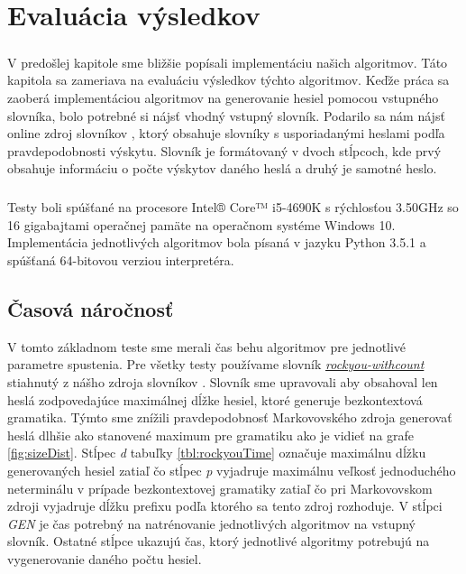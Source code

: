 \chapter{Evaluácia výsledkov}

\paragraph{}
V predošlej kapitole sme bližšie popísali implementáciu našich algoritmov. Táto kapitola sa zameriava na evaluáciu výsledkov týchto algoritmov. Keďže práca sa zaoberá implementáciou algoritmov na generovanie hesiel pomocou vstupného slovníka, bolo potrebné si nájsť vhodný vstupný slovník. Podarilo sa nám nájsť online zdroj slovníkov \cite{dictionaries}, ktorý obsahuje slovníky s usporiadanými heslami podľa pravdepodobnosti výskytu. Slovník je formátovaný v dvoch stĺpcoch, kde prvý obsahuje informáciu o počte výskytov daného heslá a druhý je samotné heslo.

\paragraph{}
Testy boli spúšťané na procesore Intel® Core™ i5-4690K s rýchlosťou 3.50GHz so 16 gigabajtami operačnej pamäte na operačnom systéme Windows 10. Implementácia jednotlivých algoritmov bola písaná v jazyku Python 3.5.1 a spúšťaná 64-bitovou verziou interpretéra.

\section{Časová náročnosť}
\label{sec:time}
V tomto základnom teste sme merali čas behu algoritmov pre jednotlivé parametre spustenia. Pre všetky testy používame slovník \emph{\href{http://downloads.skullsecurity.org/passwords/rockyou-withcount.txt.bz2}{rockyou-withcount}} stiahnutý z nášho zdroja slovníkov \cite{dictionaries}. Slovník sme upravovali aby obsahoval len heslá zodpovedajúce maximálnej dĺžke hesiel, ktoré generuje bezkontextová gramatika. Týmto sme znížili pravdepodobnosť Markovovského zdroja generovať heslá dlhšie ako stanovené maximum pre gramatiku ako je vidieť na grafe \ref{fig:sizeDist}. Stĺpec \emph{d} tabuľky \ref{tbl:rockyouTime} označuje maximálnu dĺžku generovaných hesiel zatiaľ čo stĺpec \emph{p} vyjadruje maximálnu veľkosť jednoduchého neterminálu v prípade bezkontextovej gramatiky zatiaľ čo pri Markovovskom zdroji vyjadruje dĺžku prefixu podľa ktorého sa tento zdroj rozhoduje. V stĺpci \emph{GEN} je čas potrebný na natrénovanie jednotlivých algoritmov na vstupný slovník. Ostatné stĺpce ukazujú čas, ktorý jednotlivé algoritmy potrebujú na vygenerovanie daného počtu hesiel. 

